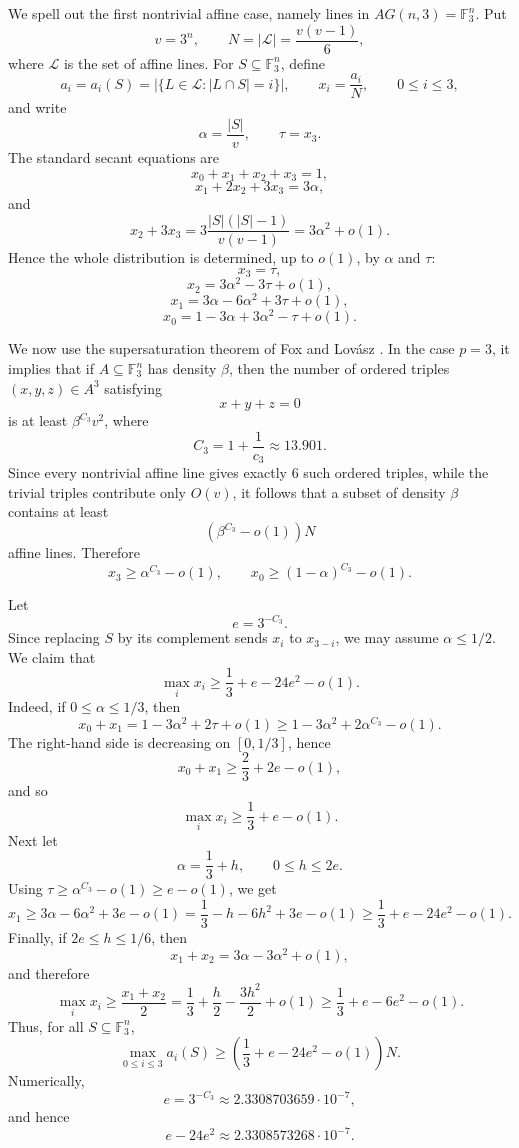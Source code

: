 \documentclass[10pt]{article}
\theoremstyle{definition}
\begin{document}
	We spell out the first nontrivial affine case, namely lines in
	\(AG(n,3)=\mathbb F_3^n\).  Put
	\[
	v=3^n,\qquad
	N=|\mathcal L|=\frac{v(v-1)}{6},
	\]
	where \(\mathcal L\) is the set of affine lines.  For
	\(S\subseteq\mathbb F_3^n\), define
	\[
	a_i=a_i(S)=|\{L\in\mathcal L:|L\cap S|=i\}|,
	\qquad
	x_i=\frac{a_i}{N},
	\qquad 0\leq i\leq 3,
	\]
	and write
	\[
	\alpha=\frac{|S|}{v},\qquad \tau=x_3.
	\]
	The standard secant equations are
	\[
	x_0+x_1+x_2+x_3=1,
	\]
	\[
	x_1+2x_2+3x_3=3\alpha,
	\]
	and
	\[
	x_2+3x_3
	=
	3\frac{|S|(|S|-1)}{v(v-1)}
	=
	3\alpha^2+o(1).
	\]
	Hence the whole distribution is determined, up to \(o(1)\), by
	\(\alpha\) and \(\tau\):
	\[
	x_3=\tau,
	\]
	\[
	x_2=3\alpha^2-3\tau+o(1),
	\]
	\[
	x_1=3\alpha-6\alpha^2+3\tau+o(1),
	\]
	\[
	x_0=1-3\alpha+3\alpha^2-\tau+o(1).
	\]
	
	We now use the supersaturation theorem of Fox and Lovász
	\cite{FoxLovaszATR}.  In the case \(p=3\), it implies that if
	\(A\subseteq\mathbb F_3^n\) has density \(\beta\), then the number of
	ordered triples \((x,y,z)\in A^3\) satisfying
	\[
	x+y+z=0
	\]
	is at least \(\beta^{C_3}v^2\), where
	\[
	C_3=1+\frac1{c_3}\approx 13.901.
	\]
	Since every nontrivial affine line gives exactly \(6\) such ordered
	triples, while the trivial triples contribute only \(O(v)\), it follows
	that a subset of density \(\beta\) contains at least
	\[
	\left(\beta^{C_3}-o(1)\right)N
	\]
	affine lines.  Therefore
	\[
	x_3\geq \alpha^{C_3}-o(1),
	\qquad
	x_0\geq (1-\alpha)^{C_3}-o(1).
	\]
	
	Let
	\[
	e=3^{-C_3}.
	\]
	Since replacing \(S\) by its complement sends \(x_i\) to \(x_{3-i}\),
	we may assume \(\alpha\leq 1/2\).  We claim that
	\[
	\max_i x_i
	\geq
	\frac13+e-24e^2-o(1).
	\]
	Indeed, if \(0\leq\alpha\leq 1/3\), then
	\[
	x_0+x_1
	=
	1-3\alpha^2+2\tau+o(1)
	\geq
	1-3\alpha^2+2\alpha^{C_3}-o(1).
	\]
	The right-hand side is decreasing on \([0,1/3]\), hence
	\[
	x_0+x_1\geq \frac23+2e-o(1),
	\]
	and so
	\[
	\max_i x_i\geq \frac13+e-o(1).
	\]
	Next let
	\[
	\alpha=\frac13+h,
	\qquad 0\leq h\leq 2e.
	\]
	Using \(\tau\geq \alpha^{C_3}-o(1)\geq e-o(1)\), we get
	\[
	x_1
	\geq
	3\alpha-6\alpha^2+3e-o(1)
	=
	\frac13-h-6h^2+3e-o(1)
	\geq
	\frac13+e-24e^2-o(1).
	\]
	Finally, if \(2e\leq h\leq 1/6\), then
	\[
	x_1+x_2
	=
	3\alpha-3\alpha^2+o(1),
	\]
	and therefore
	\[
	\max_i x_i
	\geq
	\frac{x_1+x_2}{2}
	=
	\frac13+\frac h2-\frac{3h^2}{2}+o(1)
	\geq
	\frac13+e-6e^2-o(1).
	\]
	Thus, for all \(S\subseteq\mathbb F_3^n\),
	\[
	\max_{0\leq i\leq 3} a_i(S)
	\geq
	\left(\frac13+e-24e^2-o(1)\right)N.
	\]
	Numerically,
	\[
	e=3^{-C_3}
	\approx 2.3308703659\cdot 10^{-7},
	\]
	and hence
	\[
	e-24e^2
	\approx 2.3308573268\cdot 10^{-7}.
	\]
	
\end{document}
